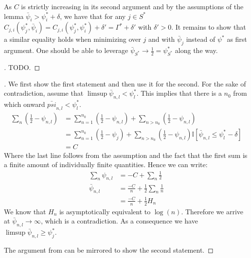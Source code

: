 \begin{remark}
  As $C$ is strictly increasing in its second argument and by the assumptions of
  the lemma $\bar{\psi}_i > \psi_i^* + \delta$, we have that for any $j \in S^*$
  $C_{j, i}(\psi_j^*, \bar{\psi}_i) = C_{j, i}(\psi_j^*, \psi_i^*) + \delta' =
  \Gamma^* + \delta'$ with $\delta' > 0$. It remains to show that a similar
  equality holds when minimizing over $j$ and with $\bar{\psi}_j$ instead of
  $\psi^*$ as first argument. One should be able to leverage $\bar{\psi}_{S^*}
  \rightarrow \frac{1}{2} = \psi_{S^*}^*$ along the way.
\end{remark}

\begin{proof}[]
  TODO.
\end{proof}

\begin{proof}[]
    We first show the first statement and then use it for the second. For the
    sake of contradiction, assume that $\limsup \bar{\psi}_{n, l} <
    \psi_l^*$. This implies that there is a $n_0$ from which onward
    $\bar{psi}_{n, l} < \psi_l^*$.
    \begin{align}
      \sum_n (\frac{1}{2} - \psi_{n, l}) &= \sum_{n=1}^{n_0} (\frac{1}{2} -
            \psi_{n, l}) + \sum_{n > n_0} (\frac{1}{2} - \psi_{n, l}) \\
        &= \sum_{n=1}^{n_0} (\frac{1}{2} - \psi_j) + \sum_{n > n_0}
            (\frac{1}{2} - \psi_{n, l})\mathbb{I}[\bar{\psi}_{n, l} \leq
            \psi_l^* - \delta] \\
        &= C
    \end{align}
    Where the last line follows from the assumption and the fact that the first
    sum is a finite amount of individually finite quantities. Hence we can
    write:
    \begin{align}
      \sum_n \psi_{n, l} &= -C + \sum_n \frac{1}{2} \\
      \bar{\psi}_{n, l} &= \frac{-C}{n} + \frac{1}{2}\sum_n\frac{1}{n} \\
        &= \frac{-C}{n} + \frac{1}{2} H_n
    \end{align}
    We know that $H_n$ is asymptotically equivalent to $\log(n)$. Therefore we
    arrive at $\bar{\psi}_{n, l} \rightarrow \infty$, which is a contradiction.
    As a consequence we have $\limsup \bar{\psi}_{n, l} \geq \psi_j^*$.

    The argument from  can be
    mirrored to show the second statement.
  \end{proof}

